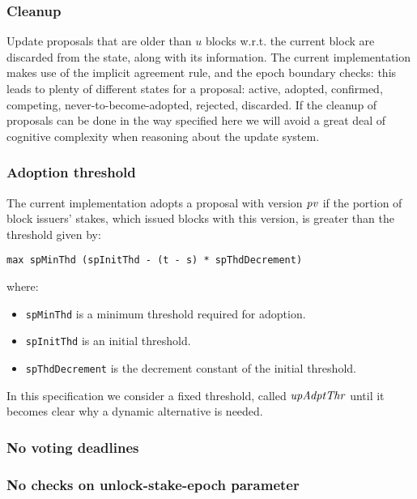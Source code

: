 \subsubsection{Cleanup}
\label{sec:up-cleanup}

Update proposals that are older than $u$ blocks w.r.t. the current block are
discarded from the state, along with its information. The current
implementation makes use of the implicit agreement rule, and the epoch boundary
checks: this leads to plenty of different states for a proposal: active,
adopted, confirmed, competing, never-to-become-adopted, rejected, discarded. If
the cleanup of proposals can be done in the way specified here we will avoid a
great deal of cognitive complexity when reasoning about the update system.

\subsubsection{Adoption threshold}
\label{sec:adoption-threshold}

The current implementation adopts a proposal with version $\mathit{pv}$ if the
portion of block issuers' stakes, which issued blocks with this version, is
greater than the threshold given by:

\begin{lstlisting}
max spMinThd (spInitThd - (t - s) * spThdDecrement)
\end{lstlisting}

where:
\begin{itemize}
\item \lstinline{spMinThd} is a minimum threshold required for adoption.
\item \lstinline{spInitThd} is an initial threshold.
\item \lstinline{spThdDecrement} is the decrement constant of the initial
  threshold.
\end{itemize}

In this specification we consider a fixed threshold, called $\mathit{upAdptThr}$
until it becomes clear why a dynamic alternative is needed.

\subsubsection{No voting deadlines}
\label{sec:no-voting-deadlines}

\subsubsection{No checks on unlock-stake-epoch parameter}
\label{sec:no-unlock-stake-epoch-check}

